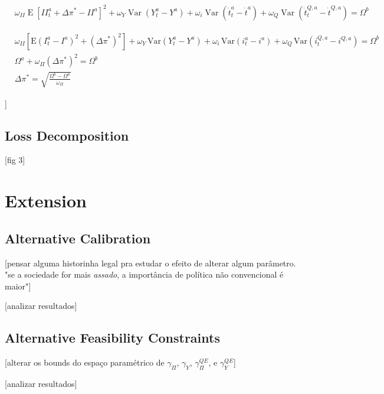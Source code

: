 \documentclass[12pt]{article}
\begin{document}
\begin{align*}
    &{\omega_{I I}}\operatorname{E}[I I_{t}^{a}+\Delta\pi^{*}-I I^{a}]^{2}+{\omega_{Y}}\operatorname{Var}(Y_{t}^{a}-Y^{a})+{\omega_{i}}\operatorname{Var}({\dot{t}}_{t}^{a}-{\dot{t}}^{a})+{\omega_{Q}}\operatorname{Var}({\dot{t}}_{t}^{Q,a}-{\dot{t}}^{Q,a})=\Omega^{b}
\end{align*}

\begin{align*}
    &{\omega_{I I}[\mathrm{E}(I_{t}^{a}-I^{a})^{2}+(\Delta\pi^{*})^{2}]}+{\omega_{Y}}\,\mathrm{Var}(Y_{t}^{a}-Y^{a})+{\omega_{i}}\,\mathrm{Var}(i_{t}^{a}-i^{a})+{\omega_{Q}}\,\mathrm{Var}(i_{t}^{Q,a}-i^{Q,a})=\Omega^{b}\\
    &\Omega^a + \omega_\Pi(\Delta\pi^*)^2 = \Omega^b\\
    &\Delta\pi^* = \sqrt{\frac{\Omega^b - \Omega^a}{\omega_\Pi}}
\end{align*}

]







\subsection{Loss Decomposition}

[fig 3]


\section{Extension}

\subsection{Alternative Calibration}

[pensar alguma historinha legal pra estudar o efeito de alterar algum parâmetro. "se a sociedade for mais \textit{assado}, a importância de política não convencional é maior"]

[analizar resultados]


\subsection{Alternative Feasibility Constraints}

[alterar os bounds do espaço paramétrico de $\gamma_\Pi$, $\gamma_Y$, $\gamma^{QE}_\Pi$, e $\gamma^{QE}_Y$]

[analizar resultados]
\end{document}
